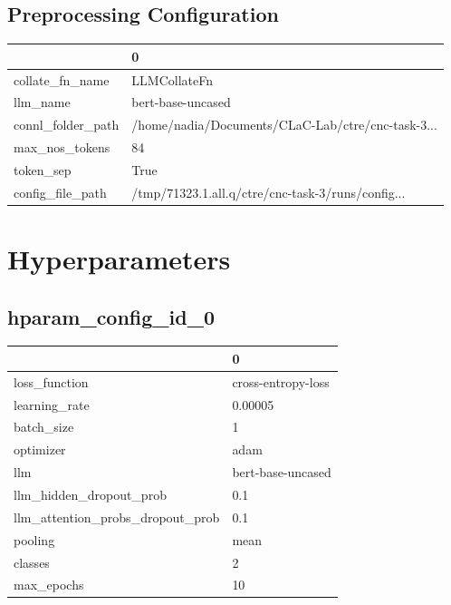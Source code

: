 \documentclass{article}
\begin{document}
\subsection{Preprocessing Configuration}
\begin{tabular}{ll}
\toprule
{} &                                                  0 \\
\midrule
collate\_fn\_name   &                                       LLMCollateFn \\
llm\_name          &                                  bert-base-uncased \\
connl\_folder\_path &  /home/nadia/Documents/CLaC-Lab/ctre/cnc-task-3... \\
max\_nos\_tokens    &                                                 84 \\
token\_sep         &                                               True \\
config\_file\_path  &  /tmp/71323.1.all.q/ctre/cnc-task-3/runs/config... \\
\bottomrule
\end{tabular}

\section{Hyperparameters}
\subsection{hparam\_config\_id\_0}
\begin{tabular}{ll}
\toprule
{} &                   0 \\
\midrule
loss\_function                    &  cross-entropy-loss \\
learning\_rate                    &             0.00005 \\
batch\_size                       &                   1 \\
optimizer                        &                adam \\
llm                              &   bert-base-uncased \\
llm\_hidden\_dropout\_prob          &                 0.1 \\
llm\_attention\_probs\_dropout\_prob &                 0.1 \\
pooling                          &                mean \\
classes                          &                   2 \\
max\_epochs                       &                  10 \\
\bottomrule
\end{tabular}
\end{document}
